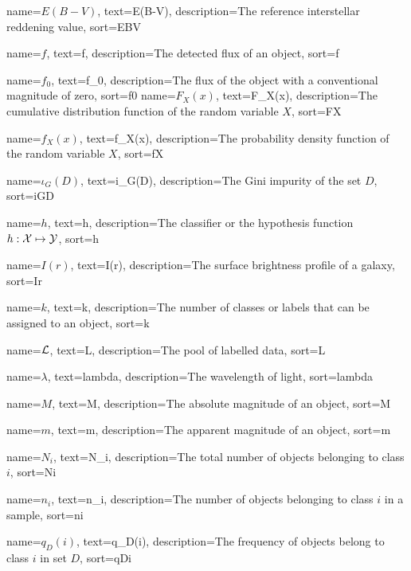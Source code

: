 %
{%
	name={$E(B-V)$},
	text={E(B-V)},
	description={The reference interstellar reddening value},
	sort={EBV}
}

%
{%
	name={$f$},
	text={f},
	description={The detected flux of an object},
	sort={f}
}

%
{%
	name={$f_0$},
	text={f_0},
	description={The flux of the object with a conventional magnitude of zero},
	sort={f0}
}
%
{%
	name={$F_X(x)$},
	text={F_X(x)},
	description={The cumulative distribution function of the random variable $X$},
	sort={FX}
}

%
{%
	name={$f_X(x)$},
	text={f_X(x)},
	description={The probability density function of the random variable $X$},
	sort={fX}
}

%
{%
	name={$\iota_G(D)$},
	text={i_G(D)},
	description={The Gini impurity of the set $D$},
	sort={iGD}
}

%
{%
	name={$h$},
	text={h},
	description={The classifier or the hypothesis function $h: \mathcal{X} \mapsto \mathcal{Y}$},
	sort={h}
}

%
{%
	name={$I(r)$},
	text={I(r)},
	description={The surface brightness profile of a galaxy},
	sort={Ir}
}

%
{%
	name={$k$},
	text={k},
	description={The number of classes or labels that can be assigned to an object},
	sort={k}
}

%
{%
	name={$\mathcal{L}$},
	text={L},
	description={The pool of labelled data},
	sort={L}
}


%
{%
	name={$\lambda$},
	text={lambda},
	description={The wavelength of light},
	sort={lambda}
}

%
{%
	name={$M$},
	text={M},
	description={The absolute magnitude of an object},
	sort={M}
}

%
{%
	name={$m$},
	text={m},
	description={The apparent magnitude of an object},
	sort={m}
}

%
{%
	name={$N_i$},
	text={N_i},
	description={The total number of objects belonging to class $i$},
	sort={Ni}
}

%
{%
	name={$n_i$},
	text={n_i},
	description={The number of objects belonging to class $i$ in a sample},
	sort={ni}
}

%
{%
	name={$q_D(i)$},
	text={q_D(i)},
	description={The frequency of objects belong to class $i$ in set $D$},
	sort={qDi}
}

